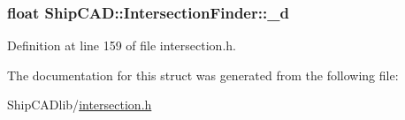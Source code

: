 \subsubsection[{\texorpdfstring{\+\_\+d}{_d}}]{\setlength{\rightskip}{0pt plus 5cm}float Ship\+C\+A\+D\+::\+Intersection\+Finder\+::\+\_\+d}\hypertarget{structShipCAD_1_1IntersectionFinder_a3155359937831f04d1f44ad660463f30}{}\label{structShipCAD_1_1IntersectionFinder_a3155359937831f04d1f44ad660463f30}


Definition at line 159 of file intersection.\+h.



The documentation for this struct was generated from the following file\+:\begin{DoxyCompactItemize}
\item 
Ship\+C\+A\+Dlib/\hyperlink{intersection_8h}{intersection.\+h}\end{DoxyCompactItemize}
